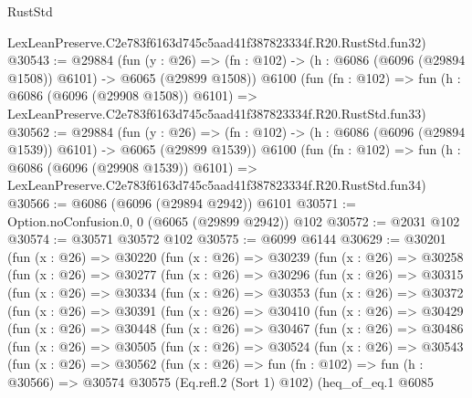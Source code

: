 \begin{lexlean}{RustStd}
\begin{coremodule}
    LexLeanPreserve.C2e783f6163d745c5aad41f387823334f.R20.RustStd.fun32)
@30543 := @29884
    (fun (y : @26) =>
    (fn : @102) -> (h : @6086 (@6096 (@29894 @1508)) @6101) -> @6065 (@29899 @1508))
    @6100
    (fun (fn : @102) =>
    fun (h : @6086 (@6096 (@29908 @1508)) @6101) =>
    LexLeanPreserve.C2e783f6163d745c5aad41f387823334f.R20.RustStd.fun33)
@30562 := @29884
    (fun (y : @26) =>
    (fn : @102) -> (h : @6086 (@6096 (@29894 @1539)) @6101) -> @6065 (@29899 @1539))
    @6100
    (fun (fn : @102) =>
    fun (h : @6086 (@6096 (@29908 @1539)) @6101) =>
    LexLeanPreserve.C2e783f6163d745c5aad41f387823334f.R20.RustStd.fun34)
@30566 := @6086 (@6096 (@29894 @2942)) @6101
@30571 := Option.noConfusion.{0, 0} (@6065 (@29899 @2942)) @102
@30572 := @2031 @102
@30574 := @30571 @30572 @102
@30575 := @6099 @6144
@30629 := @30201
    (fun (x : @26) =>
    @30220
      (fun (x : @26) =>
      @30239
        (fun (x : @26) =>
        @30258
          (fun (x : @26) =>
          @30277
            (fun (x : @26) =>
            @30296
              (fun (x : @26) =>
              @30315
                (fun (x : @26) =>
                @30334
                  (fun (x : @26) =>
                  @30353
                    (fun (x : @26) =>
                    @30372
                      (fun (x : @26) =>
                      @30391
                        (fun (x : @26) =>
                        @30410
                          (fun (x : @26) =>
                          @30429
                            (fun (x : @26) =>
                            @30448
                              (fun (x : @26) =>
                              @30467
                                (fun (x : @26) =>
                                @30486
                                  (fun (x : @26) =>
                                  @30505
                                    (fun (x : @26) =>
                                    @30524
                                      (fun (x : @26) =>
                                      @30543
                                        (fun (x : @26) =>
                                        @30562
                                          (fun (x : @26) =>
                                          fun (fn : @102) =>
                                          fun (h : @30566) =>
                                          @30574
                                            @30575
                                            (Eq.refl.{2} (Sort 1) @102)
                                            (heq_of_eq.{1}
                                              @6085

\end{coremodule}
\end{lexlean}
